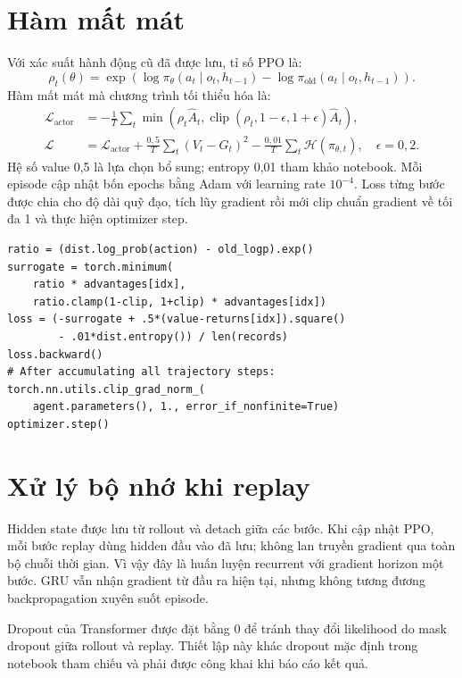 \documentclass[12pt,a4paper,oneside]{report}
\begin{document}
\section{Hàm mất mát}
Với xác suất hành động cũ đã được lưu, tỉ số PPO là:
\begin{equation}
\rho_t(\theta)=\exp\left(
\log\pi_{\theta}(a_t\mid o_t,h_{t-1})-
\log\pi_{\mathrm{old}}(a_t\mid o_t,h_{t-1})\right).
\end{equation}
Hàm mất mát mà chương trình tối thiểu hóa là:
\begin{align}
\mathcal L_{\mathrm{actor}}
&=-\frac1T\sum_t\min\left(
\rho_t\widehat A_t,
\operatorname{clip}(\rho_t,1-\epsilon,1+\epsilon)\widehat A_t\right),\\
\mathcal L
&=\mathcal L_{\mathrm{actor}}
+\frac{0{,}5}{T}\sum_t(V_t-G_t)^2
-\frac{0{,}01}{T}\sum_t\mathcal H(\pi_{\theta,t}),
\quad\epsilon=0{,}2.
\end{align}
Hệ số value 0,5 là lựa chọn bổ sung; entropy 0,01 tham khảo notebook.
Mỗi episode cập nhật bốn epochs bằng Adam với learning rate $10^{-4}$.
Loss từng bước được chia cho độ dài quỹ đạo, tích lũy gradient rồi mới
clip chuẩn gradient về tối đa 1 và thực hiện optimizer step.

\begin{lstlisting}[caption={Tính loss và cập nhật tham số trong một epoch PPO}]
ratio = (dist.log_prob(action) - old_logp).exp()
surrogate = torch.minimum(
    ratio * advantages[idx],
    ratio.clamp(1-clip, 1+clip) * advantages[idx])
loss = (-surrogate + .5*(value-returns[idx]).square()
        - .01*dist.entropy()) / len(records)
loss.backward()
# After accumulating all trajectory steps:
torch.nn.utils.clip_grad_norm_(
    agent.parameters(), 1., error_if_nonfinite=True)
optimizer.step()
\end{lstlisting}

\section{Xử lý bộ nhớ khi replay}
Hidden state được lưu từ rollout và detach giữa các bước. Khi cập nhật
PPO, mỗi bước replay dùng hidden đầu vào đã lưu; không lan truyền
gradient qua toàn bộ chuỗi thời gian. Vì vậy đây là huấn luyện recurrent
với gradient horizon một bước. GRU vẫn nhận gradient từ đầu ra hiện tại,
nhưng không tương đương backpropagation xuyên suốt episode.

Dropout của Transformer được đặt bằng 0 để tránh thay đổi likelihood do
mask dropout giữa rollout và replay. Thiết lập này khác dropout mặc định
trong notebook tham chiếu và phải được công khai khi báo cáo kết quả.
\end{document}
